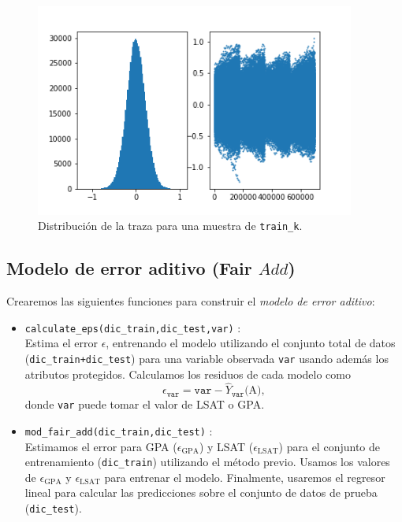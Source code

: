 \documentclass[oneside,openright,titlepage,numbers=noenddot,openany,headinclude,footinclude=true,
cleardoublepage=empty,abstractoff,BCOR=5mm,paper=a4,fontsize=12pt,main=spanish]{scrreprt}
\begin{document}
\begin{figure}[h]
	\centering
	\includegraphics[width=10.5cm]{muestrak.png}
	\caption{Distribución de la traza para una muestra de \texttt{train\_k}.}
    \label{fig:muestrak}
\end{figure}

\subsection*{Modelo de error aditivo (Fair $Add$)}

Crearemos las siguientes funciones para construir el \textit{modelo de error aditivo}:

\begin{itemize}
    \item \texttt{calculate\_eps(dic\_train,dic\_test,var)} :\\ 
    Estima el error $\epsilon$, entrenando el modelo utilizando el conjunto total de datos (\texttt{dic\_train+dic\_test}) para una variable observada \texttt{var} usando además los atributos protegidos. Calculamos los residuos de cada modelo como $$\epsilon_{\texttt{var}} = \texttt{var} - \hat{Y}_\texttt{var}\text{(A)},$$ donde \texttt{var} puede tomar el valor de LSAT o GPA.\\
    \item \texttt{mod\_fair\_add(dic\_train,dic\_test)} :\\
    Estimamos el error para GPA ($\epsilon_\text{GPA}$) y LSAT ($\epsilon_\text{LSAT}$) para el conjunto de entrenamiento (\texttt{dic\_train}) utilizando el método previo. Usamos los valores de $\epsilon_\text{GPA}$ y $\epsilon_\text{LSAT}$ para entrenar el modelo. Finalmente, usaremos el regresor lineal para calcular las predicciones sobre el conjunto de datos de prueba (\texttt{dic\_test}). 
\end{itemize}
\end{document}
